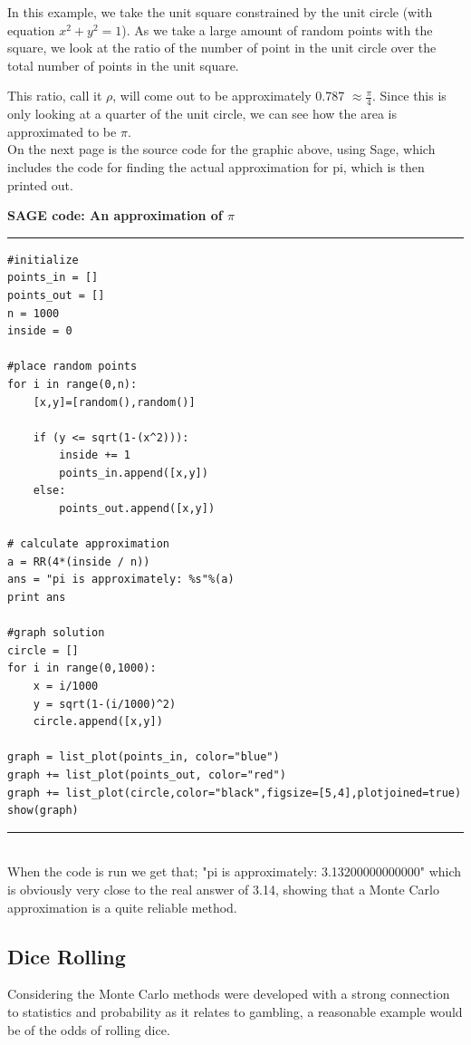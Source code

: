 \documentclass{article}
\begin{document}
In this example, we take the unit square constrained by the unit circle (with equation $x^2 + y^2 = 1$). As we take a large amount of random points with the square, we look at the ratio of the number of point in the unit circle over the total number of points in the unit square.

This ratio, call it $\rho$, will come out to be approximately 0.787 $\approx \frac{\pi}{4}$. Since this is only looking at a quarter of the unit circle, we can see how the area is approximated to be $\pi$. \\

On the next page is the source code for the graphic above, using Sage, which includes the code for finding the actual approximation for pi, which is then printed out.


\pagebreak
\noindent \textbf{SAGE code: An approximation of $\pi$}

\noindent\rule{8cm}{0.4pt}
\begin{lstlisting}
#initialize
points_in = []
points_out = []
n = 1000
inside = 0

#place random points
for i in range(0,n):
    [x,y]=[random(),random()]

    if (y <= sqrt(1-(x^2))):
        inside += 1
        points_in.append([x,y])
    else:
        points_out.append([x,y])

# calculate approximation
a = RR(4*(inside / n))
ans = "pi is approximately: %s"%(a)
print ans

#graph solution
circle = []
for i in range(0,1000):
    x = i/1000
    y = sqrt(1-(i/1000)^2)
    circle.append([x,y])

graph = list_plot(points_in, color="blue")
graph += list_plot(points_out, color="red")
graph += list_plot(circle,color="black",figsize=[5,4],plotjoined=true)
show(graph)
\end{lstlisting}
\noindent\rule{8cm}{0.4pt} \\

When the code is run we get that; "pi is approximately: 3.13200000000000" which is obviously very close to the real answer of 3.14, showing that a Monte Carlo approximation is a quite reliable method.

\pagebreak

\subsection{Dice Rolling}

\hspace{4ex} Considering the Monte Carlo methods were developed with a strong connection to statistics and probability as it relates to gambling, a reasonable example would be of the odds of rolling dice. \\
\end{document}
